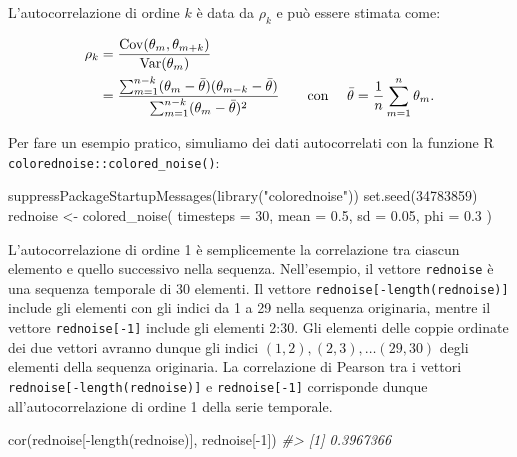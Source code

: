 \documentclass[
]{memoir}
\newenvironment{Shaded}{\begin{snugshade}}{\end{snugshade}}
\newcommand{\AttributeTok}[1]{\textcolor[rgb]{0.77,0.63,0.00}{#1}}
\newcommand{\CommentTok}[1]{\textcolor[rgb]{0.56,0.35,0.01}{\textit{#1}}}
\newcommand{\DecValTok}[1]{\textcolor[rgb]{0.00,0.00,0.81}{#1}}
\newcommand{\FloatTok}[1]{\textcolor[rgb]{0.00,0.00,0.81}{#1}}
\newcommand{\FunctionTok}[1]{\textcolor[rgb]{0.00,0.00,0.00}{#1}}
\newcommand{\NormalTok}[1]{#1}
\newcommand{\OtherTok}[1]{\textcolor[rgb]{0.56,0.35,0.01}{#1}}
\newcommand{\SpecialCharTok}[1]{\textcolor[rgb]{0.00,0.00,0.00}{#1}}
\newcommand{\StringTok}[1]{\textcolor[rgb]{0.31,0.60,0.02}{#1}}
\DeclareMathOperator{\Var}{Var} %
\DeclareMathOperator{\Cov}{Cov} %
\begin{document}
L'autocorrelazione di ordine \(k\) è data da \(\rho_k\) e può essere stimata come:

\begin{align}
\rho_k &= \frac{\Cov(\theta_m, \theta_{m+k})}{\Var(\theta_m)}\notag\\
&= \frac{\sum_{m=1}^{n-k}(\theta_m - \bar{\theta})(\theta_{m-k} - \bar{\theta})}{\sum_{m=1}^{n-k}(\theta_m - \bar{\theta})^2} \qquad\text{con }\quad \bar{\theta} = \frac{1}{n}\sum_{m=1}^{n}\theta_m.
\label{eq:autocor}
\end{align}

Per fare un esempio pratico, simuliamo dei dati autocorrelati con la funzione R \texttt{colorednoise::colored\_noise()}:

\begin{Shaded}
\begin{Highlighting}[]
\FunctionTok{suppressPackageStartupMessages}\NormalTok{(}\FunctionTok{library}\NormalTok{(}\StringTok{"colorednoise"}\NormalTok{))}
\FunctionTok{set.seed}\NormalTok{(}\DecValTok{34783859}\NormalTok{)}
\NormalTok{rednoise }\OtherTok{\textless{}{-}} \FunctionTok{colored\_noise}\NormalTok{(}
  \AttributeTok{timesteps =} \DecValTok{30}\NormalTok{, }\AttributeTok{mean =} \FloatTok{0.5}\NormalTok{, }\AttributeTok{sd =} \FloatTok{0.05}\NormalTok{, }\AttributeTok{phi =} \FloatTok{0.3}
\NormalTok{)}
\end{Highlighting}
\end{Shaded}

L'autocorrelazione di ordine 1 è semplicemente la correlazione tra ciascun elemento e quello successivo nella sequenza. Nell'esempio, il vettore \texttt{rednoise} è una sequenza temporale di 30 elementi. Il vettore \texttt{rednoise{[}-length(rednoise){]}} include gli elementi con gli indici da 1 a 29 nella sequenza originaria, mentre il vettore \texttt{rednoise{[}-1{]}} include gli elementi 2:30. Gli elementi delle coppie ordinate dei due vettori avranno dunque gli indici \((1, 2), (2, 3), \dots (29, 30)\) degli elementi della sequenza originaria. La correlazione di Pearson tra i vettori \texttt{rednoise{[}-length(rednoise){]}} e \texttt{rednoise{[}-1{]}} corrisponde dunque all'autocorrelazione di ordine 1 della serie temporale.

\begin{Shaded}
\begin{Highlighting}[]
\FunctionTok{cor}\NormalTok{(rednoise[}\SpecialCharTok{{-}}\FunctionTok{length}\NormalTok{(rednoise)], rednoise[}\SpecialCharTok{{-}}\DecValTok{1}\NormalTok{])}
\CommentTok{\#\textgreater{} [1] 0.3967366}
\end{Highlighting}
\end{Shaded}
\end{document}
